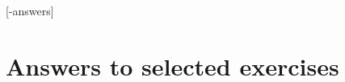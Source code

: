 \documentclass[letter,12pt]{book}
\newif\ifinterior
\newif\ifprintcover
\begin{document}
\ifprintcover
  
\else
    \raggedbottom
    \allowdisplaybreaks
    \frontmatter

    \ifinterior
      \setcounter{page}{3}
    \else
      
      \cleardoublepage
    \fi


    
    \clearpage

    
    \clearpage


    \setlength{\parskip}{3.5pt} %
    \tableofcontents
    \cleardoublepage

    \setlength{\parskip}{3.5pt} %
    
    \mainmatter

    [\jobname-answers]

    

    \chapter{Answers to selected exercises}
    \begin{enumialphparenastyle}
      
    \end{enumialphparenastyle}
    \cleardoublepage

    \cleardoublepage
    \printindex

\fi
\end{document}
